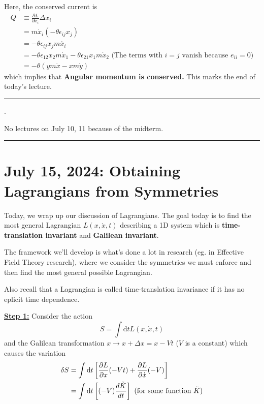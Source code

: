 \documentclass[11pt]{article}
\begin{document}
\vskip 0.5cm
Here, the conserved current is 
\begin{align*}
  Q &\equiv \frac{\partial L}{\partial \dot{x}_i} \Delta x_i \\
  &= m \dot{x}_i \left(-\theta \epsilon_{ij} x_{j}\right) \\
  &= -\theta \epsilon_{ij} x_j m\dot{x_i} \\
  &= -\theta \epsilon_{12} x_2 m\dot{x}_1 - \theta \epsilon_{21} x_1 m \dot{x}_2 \text{  (The terms with $i=j$ vanish because $e_{ii} = 0$)} \\
  &= -\theta(ym\dot{x} - xm\dot{y}) 
\end{align*}
which implies that \textbf{Angular momentum is conserved.} This marks the end of today's lecture.
\hrule

\vskip 1cm.
\begin{note}
{No lectures on July 10, 11 because of the midterm.}
\end{note}
\hrule

\pagebreak
\section{July 15, 2024: Obtaining Lagrangians from Symmetries}

Today, we wrap up our discussion of Lagrangians. The goal today is to find the most general Lagrangian $L(x, \dot{x}, t)$ describing a 1D system which is \textbf{time-translation invariant} and \textbf{Galilean invariant}.


The framework we'll develop is what's done a lot in research (eg. in Effective Field Theory research), where we consider the symmetries we must enforce and then find the most general possible Lagrangian.

\vskip 0.5cm
Also recall that a Lagrangian is called time-translation invariance if it has no eplicit time dependence. 

\vskip 0.5cm
\textbf{\underline{Step 1:}} Consider the action
\[ S = \int \mathrm{d}t L(x, \dot{x}, t) \]
and the Galilean transformation $x \rightarrow x + \Delta x = x - Vt$ ($V$ is a constant) which causes the variation
\vskip 0.5cm
\begin{align*}
  \delta S &= \int \mathrm{d}t \left[ \frac{\partial L}{\partial x}(-Vt) + \frac{\partial L}{\partial \dot{x}}(-V) \right] \\
  &= \int \mathrm{d}t \left[ (-V)\frac{d \Tilde{K}}{dt} \right]  \text{ (for some function $\Tilde{K}$)} \\
\end{align*}
\end{document}

